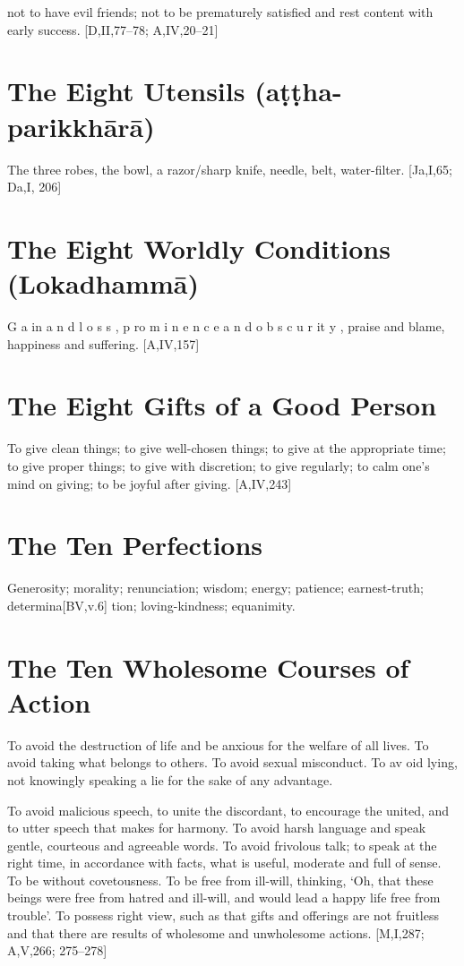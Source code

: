not to have evil friends; not to be prematurely
satisfied and rest content with early success.
[D,II,77–78; A,IV,20–21]

\section{The Eight Utensils (aṭṭha-parikkhārā)}

The three robes, the bowl, a razor/sharp
knife, needle, belt, water-filter. [Ja,I,65; Da,I, 206]

\section{The Eight Worldly Conditions (Lokadhammā)}

G a in a n d l o s s , p ro m i n e n c e a n d o b s c u r it y ,
praise and blame, happiness and suffering.
[A,IV,157]

\section{The Eight Gifts of a Good Person}

To give clean things; to give well-chosen
things; to give at the appropriate time; to give
proper things; to give with discretion; to give
regularly; to calm one’s mind on giving; to be
joyful after giving.
[A,IV,243]

\section{The Ten Perfections}

Generosity; morality; renunciation; wisdom;
energy; patience; earnest-truth; determina[BV,v.6]
tion; loving-kindness; equanimity.

\section{The Ten Wholesome Courses of Action}

To avoid the destruction of life and be anxious for the welfare of all lives. To avoid taking what belongs to others. To avoid sexual
misconduct. To av oid lying, not knowingly
speaking a lie for the sake of any advantage.

To avoid malicious speech, to unite the
discordant, to encourage the united, and to
utter speech that makes for harmony. To
avoid harsh language and speak gentle, courteous and agreeable words. To avoid frivolous
talk; to speak at the right time, in accordance
with facts, what is useful, moderate and full
of sense. To be without covetousness. To be
free from ill-will, thinking, ‘Oh, that these
beings were free from hatred and ill-will, and
would lead a happy life free from trouble’. To
possess right view, such as that gifts and
offerings are not fruitless and that there are
results of wholesome and unwholesome
actions.
[M,I,287; A,V,266; 275–278]

